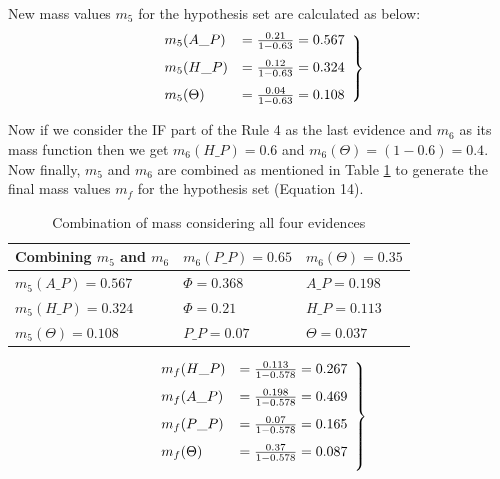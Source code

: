 \documentclass{elsarticle}
\begin{document}
New mass values $m_5$ for the hypothesis set are calculated as below:
\begin{equation}
\begin{aligned}
\left. \begin{array}{ll}
\vspace{0.25cm}
m_5 (A\_P)&=\frac{0.21}{1-0.63}=0.567\\
\vspace{0.25cm}
m_5(H\_P)&=\frac{0.12}{1-0.63}=0.324\\
m_5(\Theta)&=\frac{0.04}{1-0.63}=0.108
\end{array}\right\}
\end {aligned}
\end{equation} 

Now if we consider the IF part of the Rule 4 as the last evidence and $m_6$ as its mass function then we get $m_6(H\_P)=0.6$ and $m_6(\Theta)=(1-0.6)=0.4$. Now finally, $m_5$ and $m_6$ are combined as mentioned in Table \ref{tab:MCF3} to generate the final mass values $m_f$ for the hypothesis set (Equation 14).

\begin{table}[h]
	\small
\caption{Combination of mass considering all four evidences}
\begin{center}
\label{tab:MCF3}
\begin{tabular}{ | >{\centering\arraybackslash}m{4cm} | >{\centering\arraybackslash}m{3.25cm} | >{\centering\arraybackslash}m{3.25cm} |}
\hline
Combining $m_5$ and $m_6$ & $m_6(P\_P)=0.65$ & $m_6(\Theta)=0.35$\\
\hline
$m_5(A\_P)=0.567$ & $\Phi = 0.368$ & $A\_P=0.198$\\
\hline
$m_5(H\_P)=0.324$ & $\Phi=0.21$ & $H\_P=0.113$\\
\hline
$m_5(\Theta)=0.108$ & $P\_P=0.07$ & $\Theta=0.037$\\
\hline
\end{tabular}
\end{center}
\end{table}

\begin{equation}
\begin{aligned}
\left. \begin{array}{ll}
\vspace{0.25cm}
m_f (H\_P)&=\frac{0.113}{1-0.578}=0.267\\
\vspace{0.25cm}
m_f(A\_P)&=\frac{0.198}{1-0.578}=0.469\\
\vspace{0.25cm}
m_f(P\_P)&=\frac{0.07}{1-0.578}=0.165\\
\vspace{0.25cm}
m_f(\Theta)&=\frac{0.37}{1-0.578}=0.087
\end{array}\right\}
\end {aligned}
\end{equation} 
\end{document}
